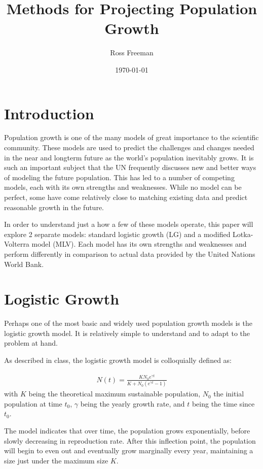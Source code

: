 \documentclass[a4paper]{article}
\begin{document}
\title{Methods for Projecting Population Growth}
\author{Ross Freeman}
\date{\today}
\maketitle
\section{Introduction}

Population growth is one of the many models of great importance to the scientific community. These models are used to predict the challenges and changes needed in the near and longterm future as the world's population inevitably grows. It is such an important subject that the UN frequently discusses new and better ways of modeling the future population. This has led to a number of competing models, each with its own strengths and weaknesses. While no model can be perfect, some have come relatively close to matching existing data and predict reasonable growth in the future. 

In order to understand just a how a few of these models operate, this paper will explore 2 separate models: standard logistic growth (LG) and a modified Lotka-Volterra model (MLV). Each model has its own strengths and weaknesses and perform differently in comparison to actual data provided by the United Nations World Bank.

\section{Logistic Growth}

Perhaps one of the most basic and widely used population growth models is the logistic growth model. It is relatively simple to understand and to adapt to the problem at hand.

As described in class, the logistic growth model is colloquially defined as:

\begin{align}
\label{eq:log-growth}
	N(t) = \frac{K N_0 e^{\gamma t}}{K + N_0 (e^{\gamma t} - 1)}
\end{align}
with $K$ being the theoretical maximum sustainable population, $N_0$ the initial population at time $t_0$, $\gamma$ being the yearly growth rate, and $t$ being the time since $t_0$.

The model indicates that over time, the population grows exponentially, before slowly decreasing in reproduction rate. After this inflection point, the population will begin to even out and eventually grow marginally every year, maintaining a size just under the maximum size $K$. 
\end{document}
